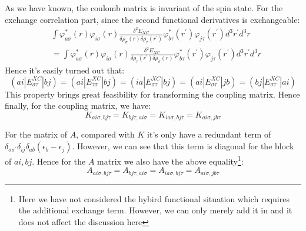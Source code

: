 As we have known, the coulomb matrix is invariant of the spin state.
For the exchange correlation part, since the second functional
derivatives is exchangeable:
\begin{equation}
\begin{split}
&\int
\varphi^{*}_{a\sigma}(r)\varphi_{i\sigma}(r)  
\frac{\delta^{2} E_{XC}}
{\delta \rho_{\sigma} (r)\delta \rho_{\tau} (r^{'})}
\varphi^{*}_{b\tau}(r^{'})\varphi_{j\tau}(r^{'})
d^{3}r^{'}d^{3}r \\
&= \int
\varphi^{*}_{a\sigma}(r)\varphi_{i\sigma}(r)  
\frac{\delta^{2} E_{XC}}
{\delta \rho_{\tau} (r^{'})\delta \rho_{\sigma} (r)}
\varphi^{*}_{b\tau}(r^{'})\varphi_{j\tau}(r^{'})
d^{3}r^{'}d^{3}r                 
\end{split}
\end{equation}  
Hence it's easily turned out that:
\begin{equation}
 (ai|E^{XC}_{\sigma\tau}|bj)   = 
(ai|E^{XC}_{\tau\sigma}|bj) = 
(ia|E^{XC}_{\sigma\tau}|bj) =
(ai|E^{XC}_{\sigma\tau}|jb) = 
(bj|E^{XC}_{\sigma\tau}|ai)      
\end{equation}
This property brings great feasibility for transforming the coupling
matrix. Hence finally, for the coupling matrix, we have:
\begin{equation}
\label{TDDFT_singlet_triplet:7}
K_{ai\sigma, bj\tau} = K_{bj\tau, ai\sigma}
= K_{ia\sigma, bj\tau} = K_{ai\sigma, jb\tau}
\end{equation}
 
For the matrix of $A$, compared with $K$ it's only have a redundant
term of $\delta_{\sigma\sigma^{'}}\delta_{ij}\delta_{ab}(\epsilon_{b}
-\epsilon_{j})$. However, we can see that this term is diagonal for
the block of $ai, bj$. Hence for the $A$ matrix we also have the
above equality\footnote{Here we have not considered the hybird
functional situation which requires the additional exchange term.
However, we can only merely add it in and it does not affect the
discussion here}:
\begin{equation}
\label{TDDFT_singlet_triplet:8}
A_{ai\sigma, bj\tau} = A_{bj\tau, ai\sigma}
= A_{ia\sigma, bj\tau} = A_{ai\sigma, jb\tau}
\end{equation}

